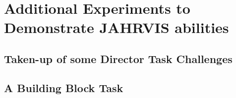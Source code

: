 \documentclass[a4paper,11pt,twoside]{StyleThese}
\begin{document}
\setcounter{chapter}{4} %
\dominitoc
\faketableofcontents
\fi

\chapter{Additional Experiments to Demonstrate JAHRVIS abilities}
\label{chapter:chap5}
\minitoc

\section{Taken-up of some Director Task Challenges}

\section{A Building Block Task}

\ifdefined{}
\else


\end{document}
